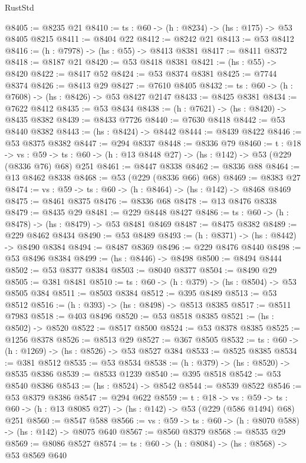 \begin{lexlean}{RustStd}
\begin{coremodule}
@8405 := @8235 @21
@8410 := {ts : @60} -> (h : @8234) -> (hs : @175) -> @53 @8405 @8215
@8411 := @8404 @22
@8412 := @8242 @21
@8413 := @53 @8412
@8416 := (h : @7978) -> (hs : @55) -> @8413 @8381
@8417 := @8411 @8372
@8418 := @8187 @21
@8420 := @53 @8418 @8381
@8421 := (hs : @55) -> @8420
@8422 := @8417 @52
@8424 := @53 @8374 @8381
@8425 := @7744 @8374
@8426 := @8413 @29
@8427 := @7610 @8405
@8432 := {ts : @60} -> (h : @7608) -> (hs : @8426) -> @53 @8427 @2147
@8433 := @8425 @8381
@8434 := @7622 @8412
@8435 := @53 @8434
@8438 := (h : @7621) -> (hs : @8420) -> @8435 @8382
@8439 := @8433 @7726
@8440 := @7630 @8418
@8442 := @53 @8440 @8382
@8443 := (hs : @8424) -> @8442
@8444 := @8439 @8422
@8446 := @53 @8375 @8382
@8447 := @294 @8337
@8448 := @8336 @79
@8460 := {t : @18} ->
  {vs : @59} -> {ts : @60} -> (h : @13 @8448 @27) -> (hs : @142) -> @53 (@229 (@8336 @76) @68) @251
@8461 := @8447 @8338
@8462 := @8336 @88
@8464 := @13 @8462 @8338
@8468 := @53 (@229 (@8336 @66) @68)
@8469 := @8383 @27
@8474 := {vs : @59} -> {ts : @60} -> (h : @8464) -> (hs : @142) -> @8468 @8469
@8475 := @8461 @8375
@8476 := @8336 @68
@8478 := @13 @8476 @8338
@8479 := @8435 @29
@8481 := @229 @8448 @8427
@8486 := {ts : @60} -> (h : @8478) -> (hs : @8479) -> @53 @8481 @8469
@8487 := @8475 @8382
@8489 := @229 @8462 @8434
@8490 := @53 @8489
@8493 := (h : @8371) -> (hs : @8442) -> @8490 @8384
@8494 := @8487 @8369
@8496 := @229 @8476 @8440
@8498 := @53 @8496 @8384
@8499 := (hs : @8446) -> @8498
@8500 := @8494 @8444
@8502 := @53 @8377 @8384
@8503 := @8040 @8377
@8504 := @8490 @29
@8505 := @381 @8481
@8510 := {ts : @60} -> (h : @379) -> (hs : @8504) -> @53 @8505 @384
@8511 := @8503 @8384
@8512 := @395 @8489
@8513 := @53 @8512
@8516 := (h : @393) -> (hs : @8498) -> @8513 @8385
@8517 := @8511 @7983
@8518 := @403 @8496
@8520 := @53 @8518 @8385
@8521 := (hs : @8502) -> @8520
@8522 := @8517 @8500
@8524 := @53 @8378 @8385
@8525 := @1256 @8378
@8526 := @8513 @29
@8527 := @367 @8505
@8532 := {ts : @60} -> (h : @1269) -> (hs : @8526) -> @53 @8527 @384
@8533 := @8525 @8385
@8534 := @381 @8512
@8535 := @53 @8534
@8538 := (h : @379) -> (hs : @8520) -> @8535 @8386
@8539 := @8533 @1239
@8540 := @395 @8518
@8542 := @53 @8540 @8386
@8543 := (hs : @8524) -> @8542
@8544 := @8539 @8522
@8546 := @53 @8379 @8386
@8547 := @294 @622
@8559 := {t : @18} ->
  {vs : @59} -> {ts : @60} -> (h : @13 @8085 @27) -> (hs : @142) -> @53 (@229 (@586 @1494) @68) @251
@8560 := @8547 @588
@8566 := {vs : @59} -> {ts : @60} -> (h : @8070 @588) -> (hs : @142) -> @8075 @640
@8567 := @8560 @8379
@8568 := @8535 @29
@8569 := @8086 @8527
@8574 := {ts : @60} -> (h : @8084) -> (hs : @8568) -> @53 @8569 @640

\end{coremodule}
\end{lexlean}
